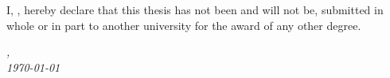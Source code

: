 

\vspace*{5cm}

\begin{flushleft}
	\large{\noindent I, \myName, hereby declare that this thesis has not been and will not be, submitted in whole or in part to another university for the award of any other degree.}
\end{flushleft}

\vspace*{2cm}

\begin{minipage}{.45\linewidth}
	\begin{flushleft} %
		\textit{\myLocation,} \\
		\textit{\today}%
	\end{flushleft}
\end{minipage}
\hfill
\begin{minipage}{.45\linewidth}
	\begin{flushright} %
		\makebox[2.5in]{\hrulefill} \\
		\myName 
	\end{flushright}
\end{minipage}\\ [0.5cm]
